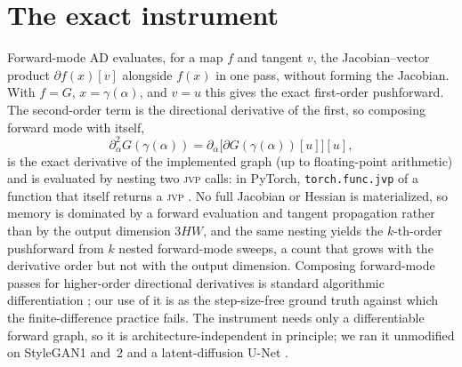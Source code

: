 \documentclass[10pt]{article} %
\newcommand{\jvp}{\textsc{jvp}}
\begin{document}
\section{The exact instrument}
\label{sec:method}
Forward-mode AD evaluates, for a map $f$ and tangent $v$, the Jacobian--vector
product $\partial f(x)[v]$ alongside $f(x)$ in one pass, without forming the
Jacobian. With $f=G$, $x=\gamma(\alpha)$, and $v=u$ this gives the exact
first-order pushforward. The second-order term is the directional derivative of
the first, so composing forward mode with itself,
\[
\partial^2_\alpha G(\gamma(\alpha))=\partial_\alpha\big[\partial
G(\gamma(\alpha))[u]\big][u],
\]
is the exact derivative of the implemented graph (up to floating-point arithmetic)
and is evaluated by nesting two \jvp{} calls: in PyTorch, \texttt{torch.func.jvp}
of a function that itself returns a \jvp{} \citep{paszke2019}. No full Jacobian or
Hessian is materialized, so memory is dominated by a forward evaluation and tangent
propagation rather than by the output dimension $3HW$, and the same nesting yields
the $k$-th-order pushforward from $k$ nested forward-mode sweeps, a count that grows
with the derivative order but not with the output dimension. Composing forward-mode passes for
higher-order directional derivatives is standard algorithmic differentiation
\citep{griewank2008}; our use of it is as the step-size-free ground truth against
which the finite-difference practice fails. The instrument needs only a
differentiable forward graph, so it is architecture-independent in principle; we ran
it unmodified on StyleGAN1 and~2 \citep{karras2019,karras2020} and a latent-diffusion
U-Net \citep{rombach2022}.
\end{document}
